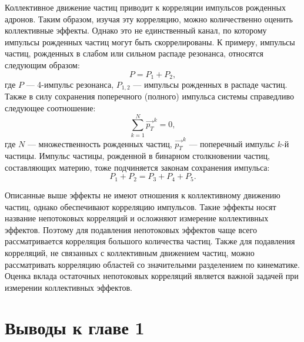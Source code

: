 Коллективное движение частиц приводит к корреляции импульсов рожденных адронов.
Таким образом, изучая эту корреляцию, можно количественно оценить коллективные эффекты.
Однако это не единственный канал, по которому импульсы рожденных частиц могут быть скоррелированы.
К примеру, импульсы частиц, рожденных в слабом или сильном распаде резонанса, относятся следующим образом:
%
\begin{equation}
    P = P_1 + P_2,
\end{equation}
где $P$ --- 4-импульс резонанса, $P_{1,2}$ --- импульсы рожденных в распаде частиц.
Также в силу сохранения поперечного (полного) импульса системы справедливо следующее соотношение:
%
\begin{equation}
    \sum_{k=1}^{N} \vec{p_T}^k = 0,
\end{equation}
где $N$ --- множественность рожденных частиц, $\vec{p_{T}}^k$ --- поперечный импульс $k$-й частицы.
Импульс частицы, рожденной в бинарном столкновении частиц, составляющих материю, тоже подчиняется законам сохранения импульса:
%
\begin{equation}
    P_1 + P_2 = P_3 + P_4 + P_5.
\end{equation}

Описанные выше эффекты не имеют отношения к коллективному движению частиц, однако обеспечивают корреляцию импульсов.
Такие эффекты носят название непотоковых корреляций и осложняют измерение коллективных эффектов.
Поэтому для подавления непотоковых эффектов чаще всего рассматривается корреляция большого количества частиц.
Также для подавления корреляций, не связанных с коллективным движением частиц, можно рассматривать корреляцию областей со значительнми разделением по кинематике.
Оценка вклада остаточных непотоковых корреляций является важной задачей при измерении коллективных эффектов.

\section{Выводы к главе 1}

